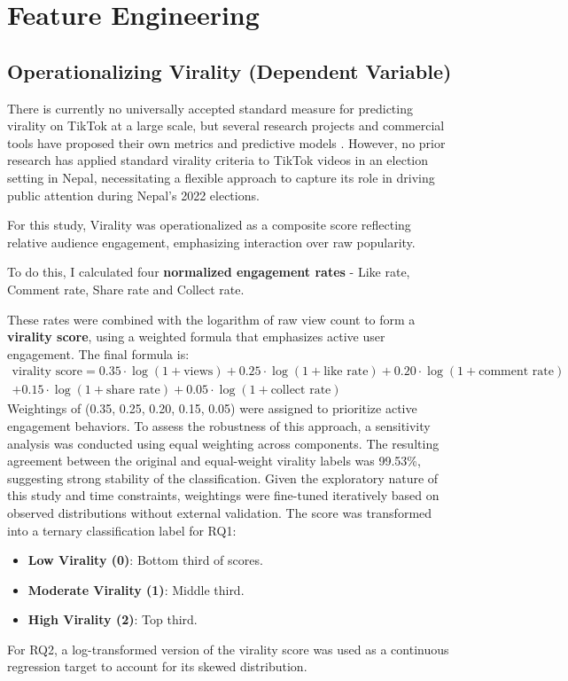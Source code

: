 \documentclass[12pt,a4paper]{report}
\begin{document}
\section{Feature Engineering}
\subsection{Operationalizing Virality (Dependent Variable)}
There is currently no universally accepted standard measure for predicting virality on TikTok at a large scale, but several research projects and commercial tools have proposed their own metrics and predictive models \parencite{roring2024decoding, SahJordan2025DecodingReddit}. However, no prior research has applied standard virality criteria to TikTok videos in an election setting in Nepal, necessitating a flexible approach to capture its role in driving public attention during Nepal’s 2022 elections.

For this study, Virality was operationalized as a composite score reflecting relative audience engagement, emphasizing interaction over raw popularity. 

To do this, I calculated four \textbf{normalized engagement rates} - Like rate, Comment rate, Share rate and Collect rate.

These rates were combined with the logarithm of raw view count to form a \textbf{virality score}, using a weighted formula that emphasizes active user engagement. The final formula is:
\begin{multline}
\text{virality score} = 0.35 \cdot \log(1 + \text{views}) + 0.25 \cdot \log(1 + \text{like rate}) + 0.20 \cdot \log(1 + \text{comment rate})  \\ + 0.15 \cdot \log(1 + \text{share rate}) + 0.05 \cdot \log(1 + \text{collect rate})
\end{multline}
Weightings of (0.35, 0.25, 0.20, 0.15, 0.05) were assigned to prioritize active engagement behaviors. To assess the robustness of this approach, a sensitivity analysis was conducted using equal weighting across components. The resulting agreement between the original and equal-weight virality labels was 99.53\%, suggesting strong stability of the classification. Given the exploratory nature of this study and time constraints, weightings were fine-tuned iteratively based on observed distributions without external validation.
\newpage 
The score was transformed into a ternary classification label for RQ1:
\begin{itemize}
    \item \textbf{Low Virality (0)}: Bottom third of scores.
    \item \textbf{Moderate Virality (1)}: Middle third.
    \item \textbf{High Virality (2)}: Top third.
\end{itemize}
For RQ2, a log-transformed version of the virality score was used as a continuous regression target to account for its skewed distribution.
\newpage
\end{document}
